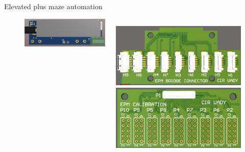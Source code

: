 \documentclass[aspectratio=169]{beamer}
\begin{document}
\begin{frame}{Elevated plus maze automation}
\begin{figure}[H]
\begin{columns}[T]
\begin{column}{.3\linewidth}
        \includegraphics[width=\linewidth]{images/EPM-auto3}
      \end{column}
      \begin{column}{.3\linewidth}
        \includegraphics[width=\linewidth]{images/EPM-auto4}
        \includegraphics[width=\linewidth]{images/EPM-auto5}
      \end{column}
    \end{columns}
  \end{figure}
\end{frame}
\end{document}
